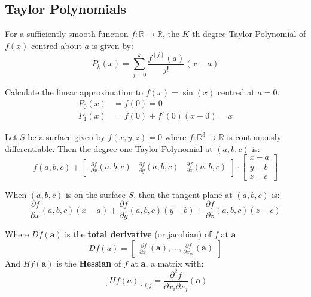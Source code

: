 \documentclass[a4paper, 11pt]{article}
\newcommand{\RR}{\mathbb{R}}
\def\pp#1#2{\frac{\partial #1}{\partial #2}}
\newenvironment{definition}[1][Definition.]{\begin{trivlist}
\item[\hskip \labelsep {\bfseries #1}]}{\end{trivlist}}
\newenvironment{example}[1][Example.]{\begin{trivlist}
\item[\hskip \labelsep {\bfseries #1}]}{\end{trivlist}}
\begin{document}
\begin{multicols}{2}
	\section*{Taylor Polynomials}
	\begin{definition}
		For a sufficiently smooth function $f:\RR\to\RR$, the $K$-th degree Taylor Polynomial of $f(x)$ centred about $a$ is given by:
		$$P_k(x)=\sum_{j=0}^{k}\frac{f^{(j)}(a)}{j!}(x-a)$$
	\end{definition}

	\begin{example}
		Calculate the linear approximation to $f(x)=\sin(x)$ centred at $a=0$.
		\begin{align*}
			P_0(x) & =f(0)=0            \\
			P_1(x) & =f(0)+f'(0)(x-0)=x
		\end{align*}
	\end{example}

	\begin{definition}
		Let $S$ be a surface given by $f(x,y,z)=0$ where $f:\RR^3\to\RR$ is continuously differentiable. Then the degree one Taylor Polynomial at $(a,b,c)$ is:
		$$
			f(a,b,c)+\begin{bmatrix}
				\frac{\partial f}{ \partial x}(a,b,c) &
				\frac{\partial f}{ \partial y}(a,b,c) &
				\frac{\partial f}{ \partial z}(a,b,c)
			\end{bmatrix} \cdot \begin{bmatrix}
				x-a \\ y-b \\ z-c
			\end{bmatrix}
		$$

		When $(a,b,c)$ is on the surface $S$, then the tangent plane at $(a,b,c)$ is:
		$$
			\frac{\partial f}{ \partial x}(a,b,c)(x-a) +
			\frac{\partial f}{ \partial y}(a,b,c)(y-b) +
			\frac{\partial f}{ \partial z}(a,b,c)(z-c)
		$$

		Where $Df(\mathbf{a})$ is the \textbf{total derivative} (or jacobian) of $f$ at $\textbf{a}$.
		\[
			Df(a)=\begin{bmatrix}
				\pp f{x_1}(\textbf{a}),\dots,\pp f{x_m}(\textbf{a})
			\end{bmatrix}
		\]
		And $Hf(\textbf{a})$ is the \textbf{Hessian} of $f$ at \textbf{a}, a matrix with:
		\[
			[Hf(a)]_{i,j} = \frac{\partial^2f}{\partial x_i \partial x_j}(\textbf{a})
		\]


	\end{definition}


\end{multicols}
\end{document}
